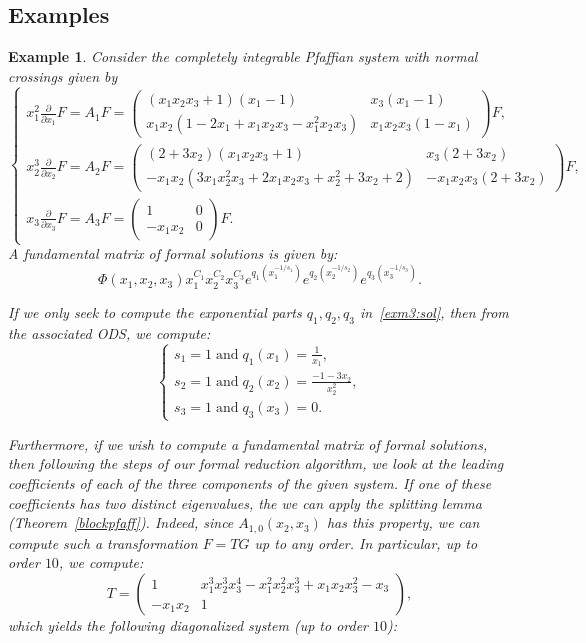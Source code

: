 \documentclass[final,1p,times,number,amsthm]{elsart}
\newtheorem{example}[lemma]{Example}
\newcommand{\pder}[2]{\frac{\partial}{\partial #2}#1}
\begin{document}
\subsection{Examples}
\begin{example}
Consider the completely integrable Pfaffian system with normal crossings given by 
  \begin{equation*}
    \begin{cases}
      x_1^{2} \pder{F}{x_1} = A_1 F = \left(\begin{matrix}
          (x_1 x_2 x_3 +1)(x_1-1)& x_3 (x_1 -1) \\
           x_1 x_2 (1 -2x_1 + x_1 x_2 x_3 - x_1^2x_2x_3)& x_1 x_2 x_3 (1-x_1)
        \end{matrix}\right) F, \\
      x_2^3 \pder{F}{x_2} = A_2 F= \left(\begin{matrix}
          (2+3 x_2) (x_1 x_2 x_3 +1) &  x_3 (2+3x_2)\\
          -x_1x_2(3x_1x_2^2x_3 + 2x_1 x_2 x_3 + x_2^2 + 3 x_2 +2) & -x_1 x_2 x_3 (2+3x_2)
        \end{matrix}\right) F,\\
           x_3 \pder{F}{x_3} = A_3 F= \left(\begin{matrix}
          1 & 0 \\
          -x_1 x_2 & 0
        \end{matrix}\right) F .
    \end{cases}
  \end{equation*}
A fundamental matrix of formal solutions is given by:
\begin{equation} \label{exm3:sol} \Phi(x_1, x_2, x_3) x_1^{C_1}x_2^{C_2} x_3^{C_3}
    e^{q_1(x_1^{- 1/s_1})} e^{q_2(x_2^{- 1/s_2})} e^{q_3(x_3^{- 1/s_3})}. \end{equation} 
    
If we only seek to compute the exponential parts $q_1, q_2, q_3$ in~\eqref{exm3:sol}, then from the associated ODS, we compute:
$$ \begin{cases} s_1 =1 \; \text{and} \; q_1(x_1) = \frac{1}{x_1},\\ s_2 =1 \; \text{and} \; q_2(x_2) = \frac{-1 - 3x_2}{x_2^2} , \\ 
s_3 =1 \; \text{and} \; q_3(x_3) =0. \end{cases}$$

Furthermore, if we wish to compute a fundamental matrix of formal solutions,
then following the steps of our formal reduction algorithm, we look at the
leading coefficients of each of the three components of the given system. If one
of these coefficients has two distinct eigenvalues, the we can apply the
splitting lemma (Theorem~\ref{blockpfaff}). Indeed, since $A_{1,0}(x_2, x_3)$ has this property, we can
compute such a transformation $ F = T G$ up to any order. In particular, up to
order $10$, we compute:
$$ T = \begin{pmatrix} 1 & x_1^3 x_2^3 x_3^4 - x_1^2 x_2^2 x_3^3 + x_1 x_2 x_3^2 - x_3 \\ -x_1 x_2 & 1 \end{pmatrix} ,$$
which yields the following diagonalized system (up to order $10$):


\end{example}
\end{document}

